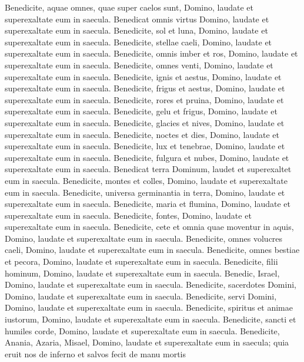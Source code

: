 \begin{biblechapter}
\begin{biblechapter}
\begin{biblechapter}
 \verse Benedicite, aquae omnes, quae super caelos sunt, Domino,
 laudate et superexaltate eum in saecula.
 \verse Benedicat omnis virtus Domino,
 laudate et superexaltate eum in saecula.
 \verse Benedicite, sol et luna, Domino,
 laudate et superexaltate eum in saecula.
 \verse Benedicite, stellae caeli, Domino,
 laudate et superexaltate eum in saecula.
 \verse Benedicite, omnis imber et ros, Domino,
 laudate et superexaltate eum in saecula.
 \verse Benedicite, omnes venti, Domino,
 laudate et superexaltate eum in saecula.
 \verse Benedicite, ignis et aestus, Domino,
 laudate et superexaltate eum in saecula.
 \verse Benedicite, frigus et aestus, Domino,
 laudate et superexaltate eum in saecula.
 \verse Benedicite, rores et pruina, Domino,
 laudate et superexaltate eum in saecula.
 \verse Benedicite, gelu et frigus, Domino,
 laudate et superexaltate eum in saecula.
 \verse Benedicite, glacies et nives, Domino,
 laudate et superexaltate eum in saecula.
 \verse Benedicite, noctes et dies, Domino,
 laudate et superexaltate eum in saecula.
 \verse Benedicite, lux et tenebrae, Domino,
 laudate et superexaltate eum in saecula.
 \verse Benedicite, fulgura et nubes, Domino,
 laudate et superexaltate eum in saecula.
 \verse Benedicat terra Dominum,
 laudet et superexaltet eum in saecula.
 \verse Benedicite, montes et colles, Domino,
 laudate et superexaltate eum in saecula.
 \verse Benedicite, universa germinantia in terra, Domino,
 laudate et superexaltate eum in saecula.
 \verse Benedicite, maria et flumina, Domino,
 laudate et superexaltate eum in saecula.
 \verse Benedicite, fontes, Domino,
 laudate et superexaltate eum in saecula.
 \verse Benedicite, cete et omnia quae moventur in aquis, Domino,
 laudate et superexaltate eum in saecula.
 \verse Benedicite, omnes volucres caeli, Domino,
 laudate et superexaltate eum in saecula.
 \verse Benedicite, omnes bestiae et pecora, Domino,
 laudate et superexaltate eum in saecula.
 \verse Benedicite, filii hominum, Domino,
 laudate et superexaltate eum in saecula.
 \verse Benedic, Israel, Domino,
 laudate et superexaltate eum in saecula.
 \verse Benedicite, sacerdotes Domini, Domino,
 laudate et superexaltate eum in saecula.
 \verse Benedicite, servi Domini, Domino,
 laudate et superexaltate eum in saecula.
 \verse Benedicite, spiritus et animae iustorum, Domino,
 laudate et superexaltate eum in saecula.
 \verse Benedicite, sancti et humiles corde, Domino,
 laudate et superexaltate eum in saecula.
 \verse Benedicite, Anania, Azaria, Misael, Domino,
 laudate et superexaltate eum in saecula;
 quia eruit nos de inferno et salvos fecit de manu mortis

\end{biblechapter}
\end{biblechapter}
\end{biblechapter}
